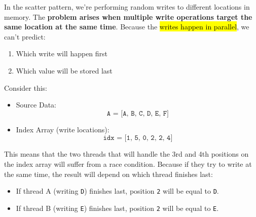 \highspace
In the scatter pattern, we're performing random writes to different locations in memory. The \textbf{problem arises when multiple write operations target the same location at the same time}. Because the \hl{writes happen in parallel}, we can't predict:
\begin{enumerate}
    \item Which write will happen first
    \item Which value will be stored last
\end{enumerate}

\highspace
\begin{examplebox}
    Consider this:
    \begin{itemize}
        \item Source Data:
        \begin{equation*}
            \texttt{A = [A, B, C, D, E, F]}
        \end{equation*}
        \item Index Array (write locations):
        \begin{equation*}
            \texttt{idx = [1, 5, 0, 2, 2, 4]}
        \end{equation*}
    \end{itemize}
    This means that the two threads that will handle the 3rd and 4th positions on the index array will suffer from a race condition. Because if they try to write at the same time, the result will depend on which thread finishes last:
    \begin{itemize}
        \item If thread A (writing \texttt{D}) finishes last, position \texttt{2} will be equal to \texttt{D}.
        \item If thread B (writing \texttt{E}) finishes last, position \texttt{2} will be equal to \texttt{E}.
    \end{itemize}
\end{examplebox}
